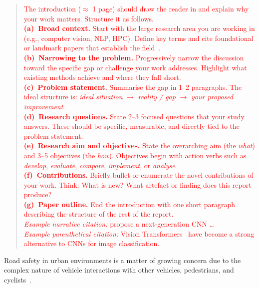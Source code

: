 \documentclass[journal, 10pt, twoside]{IEEEtran}
\begin{document}
\begin{quote}
  \textcolor{red}{%
    The introduction ($\approx$ 1 page) should draw the reader in and explain why your work matters.  Structure it as follows.\\[4pt]
    \textbf{(a)~Broad context.}  Start with the large research area you are working in (e.g., computer vision, NLP, HPC). Define key terms and cite foundational or landmark papers that establish the
    field~\citep{zhao2019object}.\\[4pt]
    \textbf{(b)~Narrowing to the problem.}  Progressively narrow the discussion toward the specific gap or challenge your work addresses.  Highlight what existing methods achieve and where they fall short.\\[4pt]
    \textbf{(c)~Problem statement.}  Summarise the gap in 1--2 paragraphs. The ideal structure is: \emph{ideal situation} $\to$ \emph{reality / gap} $\to$ \emph{your proposed improvement}.\\[4pt]
    \textbf{(d)~Research questions.}  State 2--3 focused questions that your study answers.  These should be specific, measurable, and directly tied to the problem statement.\\[4pt]
    \textbf{(e)~Research aim and objectives.}  State the overarching aim (the \emph{what}) and 3--5 objectives (the \emph{how}).  Objectives begin with action verbs such as \emph{develop}, \emph{evaluate}, \emph{compare}, \emph{implement}, or \emph{analyse}.\\[4pt]
    \textbf{(f)~Contributions.}  Briefly bullet or enumerate the novel contributions of your work.  Think: What is new?  What artefact or finding does this report produce?\\[4pt]
    \textbf{(g)~Paper outline.}  End the introduction with one short paragraph describing the structure of the rest of the report.\\[4pt]
    \emph{Example narrative citation:} \citet{liu2022convnet} propose a next-generation CNN \dots\\
    \emph{Example parenthetical citation:} Vision Transformers~\citep{dosovitskiy2020image} have become a strong alternative to CNNs for image classification.%
  }
\end{quote}

Road safety in urban environments is a matter of growing concern due to the complex nature of vehicle interactions with other vehicles, pedestrians, and cyclists~\citep{lekgothoane2015feasibility, risimati2019mapping}.
\end{document}
